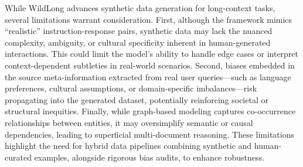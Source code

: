 While WildLong advances synthetic data generation for long-context tasks, several limitations warrant consideration. First, although the framework mimics ``realistic'' instruction-response pairs, synthetic data may lack the nuanced complexity, ambiguity, or cultural specificity inherent in human-generated interactions. This could limit the model’s ability to handle edge cases or interpret context-dependent subtleties in real-world scenarios. Second, biases embedded in the source meta-information extracted from real user queries—such as language preferences, cultural assumptions, or domain-specific imbalances—risk propagating into the generated dataset, potentially reinforcing societal or structural inequities. Finally, while graph-based modeling captures co-occurrence relationships between entities, it may oversimplify semantic or causal dependencies, leading to superficial multi-document reasoning. %
These limitations highlight the need for hybrid data pipelines combining synthetic and human-curated examples, alongside rigorous bias audits, to enhance robustness.




